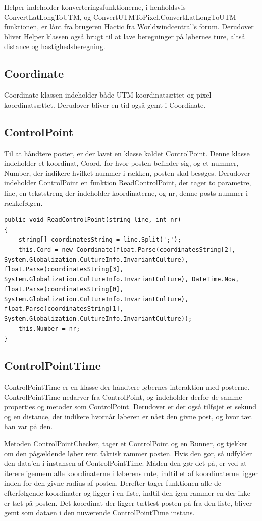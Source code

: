 Helper indeholder konverteringsfunktionerne, i henholdsvis ConvertLatLongToUTM, og ConvertUTMToPixel.ConvertLatLongToUTM funktionen, er lånt fra brugeren Hactic fra Worldwindcentral's forum\citep{UTM}.
Derudover bliver Helper klassen også brugt til at lave beregninger på løbernes ture, altså distance og hastighedsberegning. 

\subsection{Coordinate}
Coordinate klassen indeholder både UTM koordinatsættet og pixel koordinatsættet. Derudover bliver en tid også gemt i Coordinate.

\subsection{ControlPoint}
Til at håndtere poster, er der lavet en klasse kaldet ControlPoint. Denne klasse indeholder et koordinat, Coord, for hvor posten befinder sig, og et nummer, Number, der indikere hvilket nummer i rækken, posten skal besøges. 
Derudover indeholder ControlPoint en funktion ReadControlPoint, der tager to parametre, line, en tekststreng der indeholder koordinaterne, og nr, denne posts nummer i rækkefølgen. 

\begin{lstlisting}
public void ReadControlPoint(string line, int nr)
{
    string[] coordinatesString = line.Split(';');
    this.Cord = new Coordinate(float.Parse(coordinatesString[2], System.Globalization.CultureInfo.InvariantCulture), float.Parse(coordinatesString[3], System.Globalization.CultureInfo.InvariantCulture), DateTime.Now, float.Parse(coordinatesString[0], System.Globalization.CultureInfo.InvariantCulture), float.Parse(coordinatesString[1], System.Globalization.CultureInfo.InvariantCulture));
    this.Number = nr;
}
\end{lstlisting}

\subsection{ControlPointTime}
ControlPointTime er en klasse der håndtere løbernes interaktion med posterne. ControlPointTime nedarver fra ControlPoint, og indeholder derfor de samme properties og metoder som ControlPoint. Derudover er der også tilføjet et sekund og en distance, der indikere hvornår løberen er nået den givne post, og hvor tæt han var på den. 

Metoden ControlPointChecker, tager et ControlPoint og en Runner, og tjekker om den pågældende løber rent faktisk rammer posten. Hvis den gør, så udfylder den data’en i instansen af ControlPointTime. 
Måden den gør det på, er ved at iterere igennem alle koordinaterne i løberens rute, indtil et af koordinaterne ligger inden for den givne radius af posten. Derefter tager funktionen alle de efterfølgende koordinater og ligger i en liste, indtil den igen rammer en der ikke er tæt på posten. 
Det koordinat der ligger tættest posten på fra den liste, bliver gemt som dataen i den nuværende ControlPointTime instans. 


